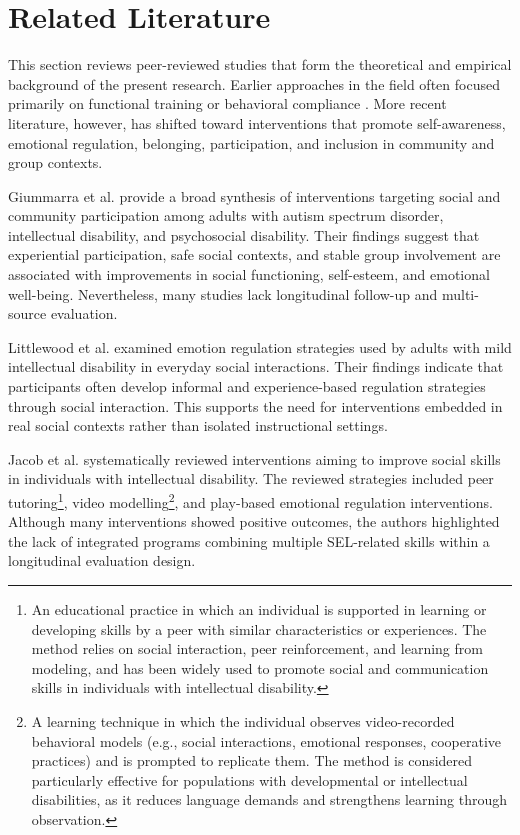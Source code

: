\documentclass[journal]{IEEEtran}
\begin{document}
\section{Related Literature}

This section reviews peer-reviewed studies that form the theoretical and empirical background of the present research. Earlier approaches in the field often focused primarily on functional training or behavioral compliance \cite{emerson2001}. More recent literature, however, has shifted toward interventions that promote self-awareness, emotional regulation, belonging, participation, and inclusion in community and group contexts.

Giummarra et al. \cite{giummarra2022} provide a broad synthesis of interventions targeting social and community participation among adults with autism spectrum disorder, intellectual disability, and psychosocial disability. Their findings suggest that experiential participation, safe social contexts, and stable group involvement are associated with improvements in social functioning, self-esteem, and emotional well-being. Nevertheless, many studies lack longitudinal follow-up and multi-source evaluation.

Littlewood et al. \cite{littlewood2018} examined emotion regulation strategies used by adults with mild intellectual disability in everyday social interactions. Their findings indicate that participants often develop informal and experience-based regulation strategies through social interaction. This supports the need for interventions embedded in real social contexts rather than isolated instructional settings.

Jacob et al. \cite{jacob2022} systematically reviewed interventions aiming to improve social skills in individuals with intellectual disability. The reviewed strategies included peer tutoring\footnote{An educational practice in which an individual is supported in learning or developing skills by a peer with similar characteristics or experiences. The method relies on social interaction, peer reinforcement, and learning from modeling, and has been widely used to promote social and communication skills in individuals with intellectual disability.}, video modelling\footnote{A learning technique in which the individual observes video-recorded behavioral models (e.g., social interactions, emotional responses, cooperative practices) and is prompted to replicate them. The method is considered particularly effective for populations with developmental or intellectual disabilities, as it reduces language demands and strengthens learning through observation.}, and play-based emotional regulation interventions. Although many interventions showed positive outcomes, the authors highlighted the lack of integrated programs combining multiple SEL-related skills within a longitudinal evaluation design.
\end{document}
